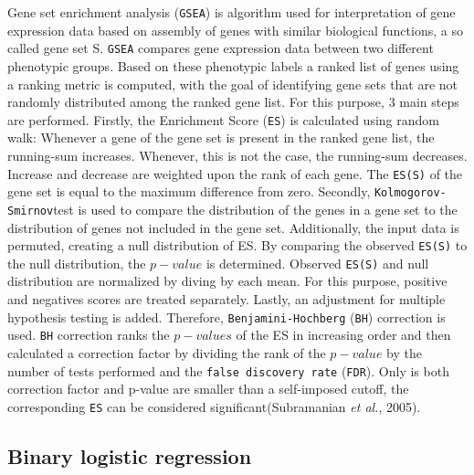 \documentclass[
  parskip,
  openany]{scrreprt}
\begin{document}
Gene set enrichment analysis (\texttt{GSEA}) is algorithm used for
interpretation of gene expression data based on assembly of genes with
similar biological functions, a so called gene set S. \texttt{GSEA}
compares gene expression data between two different phenotypic groups.
Based on these phenotypic labels a ranked list of genes using a ranking
metric is computed, with the goal of identifying gene sets that are not
randomly distributed among the ranked gene list. For this purpose, 3
main steps are performed. Firstly, the Enrichment Score (\texttt{ES}) is
calculated using random walk: Whenever a gene of the gene set is present
in the ranked gene list, the running-sum increases. Whenever, this is
not the case, the running-sum decreases. Increase and decrease are
weighted upon the rank of each gene. The \texttt{ES(S)} of the gene set
is equal to the maximum difference from zero. Secondly,
\texttt{Kolmogorov-Smirnov}test is used to compare the distribution of
the genes in a gene set to the distribution of genes not included in the
gene set. Additionally, the input data is permuted, creating a null
distribution of ES. By comparing the observed \texttt{ES(S)} to the null
distribution, the \(p-value\) is determined. Observed \texttt{ES(S)} and
null distribution are normalized by diving by each mean. For this
purpose, positive and negatives scores are treated separately. Lastly,
an adjustment for multiple hypothesis testing is added. Therefore,
\texttt{Benjamini-Hochberg} (\texttt{BH}) correction is used.
\texttt{BH} correction ranks the \(p-values\) of the ES in increasing
order and then calculated a correction factor by dividing the rank of
the \(p-value\) by the number of tests performed and the
\texttt{false\ discovery\ rate} (\texttt{FDR}). Only is both correction
factor and p-value are smaller than a self-imposed cutoff, the
corresponding \texttt{ES} can be considered significant(Subramanian
\emph{et al.}, 2005).

\hypertarget{binary-logistic-regression}{%
\subsection{Binary logistic
regression}\label{binary-logistic-regression}}
\end{document}
